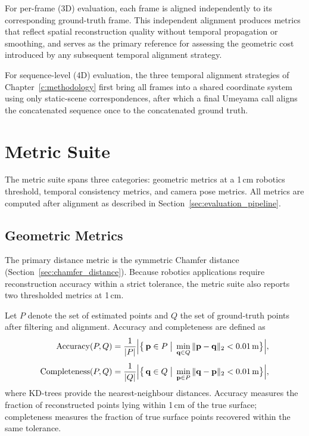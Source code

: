 For per-frame (3D) evaluation, each frame is aligned independently to its corresponding ground-truth frame. This independent alignment produces metrics that reflect spatial reconstruction quality without temporal propagation or smoothing, and serves as the primary reference for assessing the geometric cost introduced by any subsequent temporal alignment strategy.

For sequence-level (4D) evaluation, the three temporal alignment strategies of Chapter~\ref{c:methodology} first bring all frames into a shared coordinate system using only static-scene correspondences, after which a final Umeyama call aligns the concatenated sequence once to the concatenated ground truth.

\section{Metric Suite}
\label{sec:metrics}

The metric suite spans three categories: geometric metrics at a 1\,cm robotics threshold, temporal consistency metrics, and camera pose metrics. All metrics are computed after alignment as described in Section~\ref{sec:evaluation_pipeline}.

\subsection{Geometric Metrics}

The primary distance metric is the symmetric Chamfer distance (Section~\ref{sec:chamfer_distance}). Because robotics applications require reconstruction accuracy within a strict tolerance, the metric suite also reports two thresholded metrics at 1\,cm.

Let $P$ denote the set of estimated points and $Q$ the set of ground-truth points after filtering and alignment. Accuracy and completeness are defined as
\begin{align}
\text{Accuracy}(P,Q)
    &= \frac{1}{|P|}\Bigl|\bigl\{\,\mathbf{p}\in P
       \;\big|\; \min_{\mathbf{q}\in Q}\|\mathbf{p}-\mathbf{q}\|_2 < 0.01\,\text{m}
       \bigr\}\Bigr|, \\[4pt]
\text{Completeness}(P,Q)
    &= \frac{1}{|Q|}\Bigl|\bigl\{\,\mathbf{q}\in Q
       \;\big|\; \min_{\mathbf{p}\in P}\|\mathbf{q}-\mathbf{p}\|_2 < 0.01\,\text{m}
       \bigr\}\Bigr|,
\end{align}
where KD-trees provide the nearest-neighbour distances. Accuracy measures the fraction of reconstructed points lying within 1\,cm of the true surface; completeness measures the fraction of true surface points recovered within the same tolerance.

